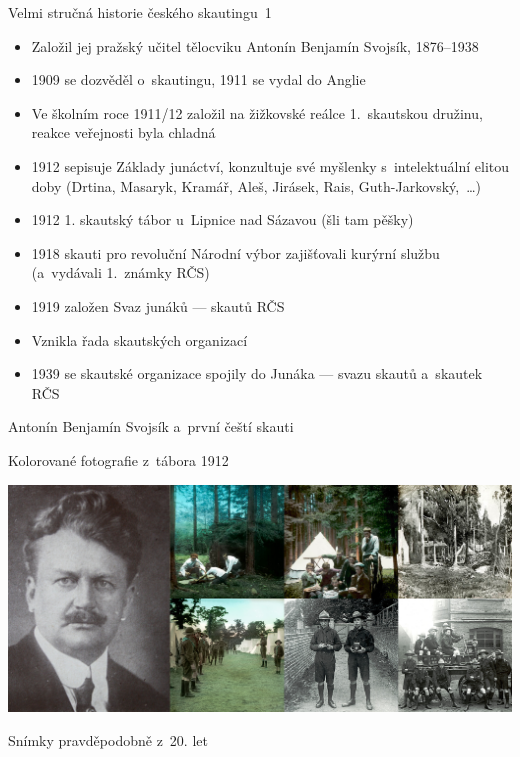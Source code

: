 \documentclass[hyperref={bookmarks=true, unicode=true, colorlinks=true, plainpages=false, pdfkeywords={Skaut, Junak, Skauting, Vychovna metoda}, linkcolor=OrangeRed, anchorcolor=OrangeRed, citecolor=RawSienna, filecolor=RawSienna, menucolor=OrangeRed, urlcolor=RawSienna, pdftex}, compress, xelatex, xcolor=dvipsnames, print]{beamer}
\begin{document}
\begin{frame}{Velmi stručná historie českého skautingu~1}
\begin{itemize}
 \item Založil jej pražský učitel tělocviku Antonín Benjamín Svojsík, 1876--1938
 \item 1909 se dozvěděl o~skautingu, 1911 se vydal do Anglie
 \item Ve školním roce 1911/12 založil na žižkovské reálce 1.~skautskou družinu, reakce veřejnosti byla chladná
 \item 1912 sepisuje \alert{Základy junáctví}, konzultuje své myšlenky s~intelektuální elitou doby (Drtina, Masaryk, Kramář, Aleš, Jirásek, Rais, Guth-Jarkovský,~\ldots)
 \item 1912 1. skautský tábor u~Lipnice nad Sázavou (šli tam pěšky)
 \item 1918 skauti pro revoluční Národní výbor zajišťovali kurýrní službu (a~vydávali 1.~známky RČS)
 \item 1919 založen Svaz junáků --- skautů RČS
 \item Vznikla řada skautských organizací
 \item 1939 se skautské organizace spojily do Junáka --- svazu skautů a~skautek RČS
\end{itemize}
\end{frame}

\begin{frame}{Antonín Benjamín Svojsík a~první čeští skauti}
\begin{flushright}
Kolorované fotografie z~tábora 1912\\
\end{flushright}
\includegraphics[width=\textwidth]{svojsik_prvni_skauti.jpg}
\begin{flushright}
Snímky pravděpodobně z~20. let\\
\end{flushright}
\end{frame}
\end{document}
